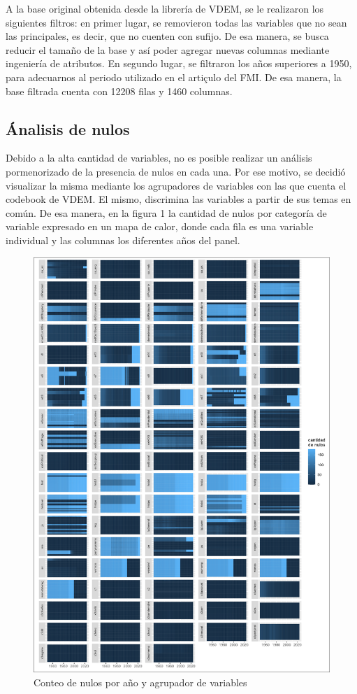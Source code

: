 \documentclass{article}
\begin{document}
A la base original obtenida desde la librería de VDEM, se le realizaron los
siguientes filtros: en primer lugar, se removieron todas las variables que
no sean las principales, es decir, que no cuenten con sufijo. De esa manera,
se busca reducir el tamaño de la base y así poder agregar nuevas columnas
mediante ingeniería de atributos. En segundo lugar, se filtraron los años 
superiores a 1950, para adecuarnos al periodo utilizado en el artiçulo del FMI.
De esa manera, la base filtrada cuenta con 12208 filas y 1460 columnas.

\subsection{Ánalisis de nulos}
Debido a la alta cantidad de variables, no es posible realizar un análisis
pormenorizado de la presencia de nulos en cada una. Por ese motivo, se decidió
visualizar la misma mediante los agrupadores de variables con las que cuenta el
codebook de VDEM. El mismo, discrimina las variables a partir de sus temas en común.
De esa manera, en la figura 1 la cantidad de nulos por categoría de variable
expresado en un mapa de calor, donde cada fila es una variable individual y las
columnas los diferentes años del panel.

\begin{figure}[H]
  \centering  
  \includegraphics[width=1\textwidth]{1_nas.png}
  \caption{Conteo de nulos por año y agrupador de variables}
\end{figure}
\end{document}
